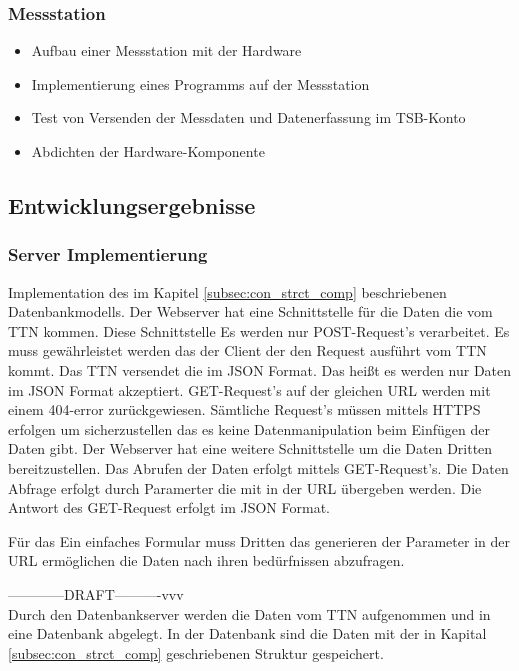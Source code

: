 \subsubsection{Messstation}
\begin{itemize}
	\item Aufbau einer Messstation mit der Hardware
	\item Implementierung eines Programms auf der Messstation
	\item Test von Versenden der Messdaten und Datenerfassung im TSB-Konto
	\item Abdichten der Hardware-Komponente
\end{itemize}

\subsection{Entwicklungsergebnisse}


\subsubsection{Server Implementierung}

Implementation des im Kapitel \ref{subsec:con_strct_comp} beschriebenen Datenbankmodells. Der Webserver hat eine Schnittstelle für die Daten die vom TTN kommen. Diese Schnittstelle Es werden nur POST-Request's verarbeitet. Es muss gewährleistet werden das der Client der den Request ausführt vom TTN kommt. Das TTN versendet die im JSON Format. Das heißt es werden nur Daten im JSON Format akzeptiert. GET-Request's auf der gleichen URL werden mit einem 404-error zurückgewiesen. Sämtliche Request's müssen mittels HTTPS erfolgen um sicherzustellen das es keine Datenmanipulation beim Einfügen der Daten gibt.
Der Webserver hat eine weitere Schnittstelle um die Daten Dritten bereitzustellen. Das Abrufen der Daten erfolgt mittels GET-Request's. Die Daten Abfrage erfolgt durch Paramerter die mit in der URL übergeben werden. Die Antwort des GET-Request erfolgt im JSON Format.

Für das Ein einfaches Formular muss Dritten das generieren der Parameter in der URL ermöglichen die Daten nach ihren bedürfnissen abzufragen.

------------DRAFT----------vvv\\
Durch den Datenbankserver werden die Daten vom TTN aufgenommen und in eine Datenbank abgelegt. In der Datenbank sind die Daten mit der in Kapital \ref{subsec:con_strct_comp} geschriebenen Struktur gespeichert. 

